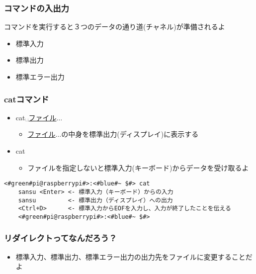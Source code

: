 \begin{frame}
    \frametitle{コマンドの入出力}
    コマンドを実行すると３つのデータの通り道(チャネル)が準備されるよ
    \begin{itemize}
        \item 標準入力
        \item 標準出力
        \item 標準エラー出力
    \end{itemize}
    \begin{figure}[h]
        \centering
        
    \end{figure}
\end{frame}

\begin{frame}[fragile]
    \frametitle{catコマンド}
    \begin{itemize}
        \item cat␣\underline{ファイル}$\ldots$
        \begin{itemize}
            \item \underline{ファイル}$\ldots$の中身を標準出力(ディスプレイ)に表示する
        \end{itemize}
        \item cat
        \begin{itemize}
            \item ファイルを指定しないと標準入力(キーボード)からデータを受け取るよ
        \end{itemize}
    \end{itemize}
    \begin{lstlisting}[title=catの標準入力・標準出力, label=stdioCat]
    <#green#pi@raspberrypi#>:<#blue#~ $#> cat 
    sansu <Enter> <- 標準入力（キーボード）からの入力
    sansu         <- 標準出力（ディスプレイ）への出力
    <Ctrl+D>      <- 標準入力からEOFを入力し、入力が終了したことを伝える
    <#green#pi@raspberrypi#>:<#blue#~ $#>
    \end{lstlisting}
\end{frame}

\begin{frame}
    \frametitle{リダイレクトってなんだろう？}
    \begin{itemize}
        \item 標準入力、標準出力、標準エラー出力の出力先をファイルに変更することだよ
    \end{itemize}
    \begin{figure}
        \centering
        
    \end{figure}
\end{frame}

